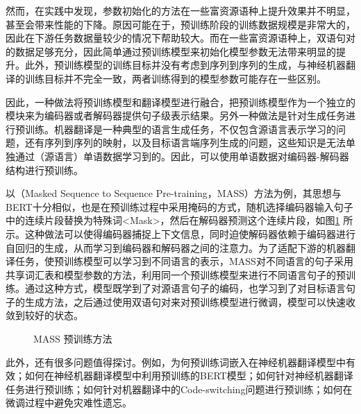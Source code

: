 \parinterval 然而，在实践中发现，参数初始化的方法在一些富资源语种上提升效果并不明显，甚至会带来性能的下降。原因可能在于，预训练阶段的训练数据规模是非常大的，因此在下游任务数据量较少的情况下帮助较大。而在一些富资源语种上，双语句对的数据足够充分，因此简单通过预训练模型来初始化模型参数无法带来明显的提升。此外，预训练模型的训练目标并没有考虑到序列到序列的生成，与神经机器翻译的训练目标并不完全一致，两者训练得到的模型参数可能存在一些区别。

\parinterval 因此，一种做法将预训练模型和翻译模型进行融合，把预训练模型作为一个独立的模块来为编码器或者解码器提供句子级表示结果。另外一种做法是针对生成任务进行预训练。机器翻译是一种典型的语言生成任务，不仅包含源语言表示学习的问题，还有序列到序列的映射，以及目标语言端序列生成的问题，这些知识是无法单独通过（源语言）单语数据学习到的。因此，可以使用单语数据对编码器-解码器结构进行预训练。

\parinterval 以{\small{}}（Masked Sequence to Sequence Pre-training，MASS）方法为例，其思想与BERT十分相似，也是在预训练过程中采用掩码的方式，随机选择编码器输入句子中的连续片段替换为特殊词<Mask>，然后在解码器预测这个连续片段，如图\ref{fig:16-6} 所示。这种做法可以使得编码器捕捉上下文信息，同时迫使解码器依赖于编码器进行自回归的生成，从而学习到编码器和解码器之间的注意力。为了适配下游的机器翻译任务，使预训练模型可以学习到不同语言的表示，MASS对不同语言的句子采用共享词汇表和模型参数的方法，利用同一个预训练模型来进行不同语言句子的预训练。通过这种方式，模型既学到了对源语言句子的编码，也学习到了对目标语言句子的生成方法，之后通过使用双语句对来对预训练模型进行微调，模型可以快速收敛到较好的状态。

\begin{figure}[htp]
\centering

\caption{MASS 预训练方法}
\label{fig:16-6}
\end{figure}

\parinterval  此外，还有很多问题值得探讨。例如，为何预训练词嵌入在神经机器翻译模型中有效；如何在神经机器翻译模型中利用预训练的BERT模型；如何针对神经机器翻译任务进行预训练；如何针对机器翻译中的Code-switching问题进行预训练；如何在微调过程中避免灾难性遗忘。

